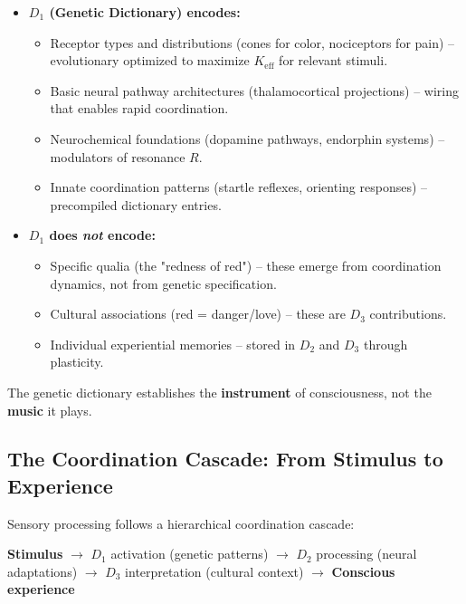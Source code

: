 \documentclass[12pt,a4paper]{article}
\newcommand{\eff}{\mathrm{eff}}
\newcommand{\Ke}{K_{\eff}}
\begin{document}
	\begin{itemize}
		\item \textbf{$D_1$ (Genetic Dictionary) encodes:}
		\begin{itemize}
			\item Receptor types and distributions (cones for color, nociceptors for pain) – evolutionary optimized to maximize $\Ke$ for relevant stimuli.
			\item Basic neural pathway architectures (thalamocortical projections) – wiring that enables rapid coordination.
			\item Neurochemical foundations (dopamine pathways, endorphin systems) – modulators of resonance $R$.
			\item Innate coordination patterns (startle reflexes, orienting responses) – precompiled dictionary entries.
		\end{itemize}
		
		\item \textbf{$D_1$ does \textit{not} encode:}
		\begin{itemize}
			\item Specific qualia (the "redness of red") – these emerge from coordination dynamics, not from genetic specification.
			\item Cultural associations (red = danger/love) – these are $D_3$ contributions.
			\item Individual experiential memories – stored in $D_2$ and $D_3$ through plasticity.
		\end{itemize}
	\end{itemize}
	
	The genetic dictionary establishes the \textbf{instrument} of consciousness, not the \textbf{music} it plays.
	
	\subsection{The Coordination Cascade: From Stimulus to Experience}
	
	Sensory processing follows a hierarchical coordination cascade:
	
	\begin{center}
		\textbf{Stimulus} $\rightarrow$ $D_1$ activation (genetic patterns) $\rightarrow$ $D_2$ processing (neural adaptations) $\rightarrow$ $D_3$ interpretation (cultural context) $\rightarrow$ \textbf{Conscious experience}
	\end{center}
	
\end{document}
